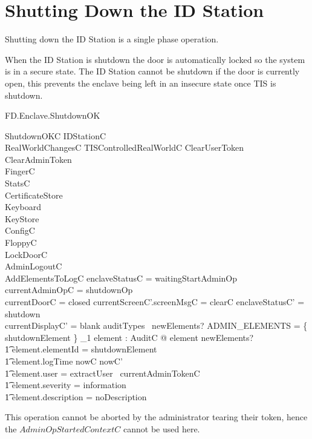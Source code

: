 \section{Shutting Down the ID Station}


Shutting down the ID Station is a single phase operation.

When the ID Station is shutdown the door is automatically locked so
the system is in a secure state. The ID Station cannot be shutdown if
the door is currently open, this prevents the enclave being left in an
insecure state once TIS is shutdown.

\begin{traceunit}{FD.Enclave.ShutdownOK}
\end{traceunit}


\begin{schema}{ShutdownOKC}
        \Delta IDStationC
\\      RealWorldChangesC
\also
        \Xi TISControlledRealWorldC
\also   
        ClearUserToken
\\      ClearAdminToken
\\      \Xi FingerC
\\      \Xi StatsC
\\      \Xi CertificateStore
\\      \Xi Keyboard
\\      \Xi KeyStore
\\      \Xi ConfigC
\\      \Xi FloppyC
\\      LockDoorC
\\      AdminLogoutC
\\      AddElementsToLogC
\where
        enclaveStatusC = waitingStartAdminOp
\\      \The currentAdminOpC = shutdownOp
\\      currentDoorC = closed
\also
        currentScreenC'.screenMsgC = clearC
\also
        enclaveStatusC' = shutdown
\\      currentDisplayC' = blank
\also
        auditTypes~ newElements? \cap ADMIN\_ELEMENTS = 
        \{ shutdownElement \} 
\also
        \exists_1 element : AuditC @ element \in newElements? 
\\ \t1  \land element.elementId = shutdownElement
\\ \t1  \land element.logTime \in nowC \upto nowC'
\\ \t1  \land element.user = extractUser~ currentAdminTokenC
\\ \t1  \land element.severity = information
\\ \t1  \land element.description = noDescription
\end{schema}
\begin{Zcomment}
\item
This operation cannot be aborted by the administrator tearing their
token, hence the $AdminOpStartedContextC$ cannot be used here.
\end{Zcomment}

